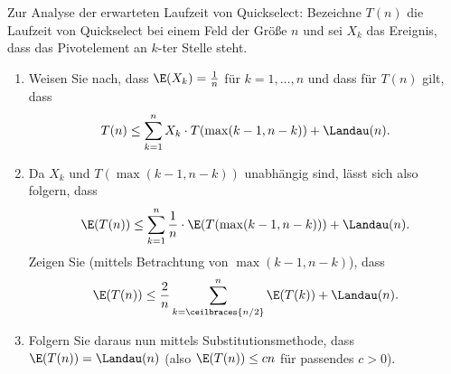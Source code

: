 
\begin{exercise}

Zur Analyse der erwarteten Laufzeit von Quickselect: Bezeichne $T(n)$ die Laufzeit
von Quickselect bei einem Feld der Größe $n$ und sei $X_k$ das Ereignis, dass das
Pivotelement an $k$-ter Stelle steht.
\begin{enumerate}[label = \alph*)]
  \item Weisen Sie nach, dass $\E(X_k) = \frac{1}{n}$ für $k = 1,\dots,n$ und dass
  für $T(n)$ gilt, dass
  \begin{align*}
    T(n) \leq \sum_{k=1}^n X_k \cdot T(\max(k-1,n-k)) + \Landau(n).
  \end{align*}
  \item Da $X_k$ und $T(\max(k-1,n-k))$ unabhängig sind, lässt sich also folgern, dass
  \begin{align*}
    \E(T(n)) \leq \sum_{k=1}^n \frac{1}{n} \cdot \E(T(\max(k-1,n-k))) + \Landau(n).
  \end{align*}
  Zeigen Sie (mittels Betrachtung von $\max(k-1,n-k)$), dass
  \begin{align*}
    \E(T(n)) \leq \frac{2}{n}\sum_{k=\ceilbraces{n/2}}^n \E(T(k)) + \Landau(n).
  \end{align*}
  \item Folgern Sie daraus nun mittels Substitutionsmethode, dass $\E(T(n)) = \Landau(n)$
  (also $\E(T(n)) \leq cn$ für passendes $c > 0$).
\end{enumerate}

\end{exercise}



\begin{solution}

\phantom{}

\end{solution}
